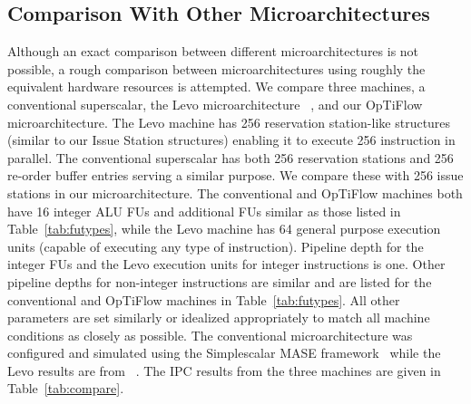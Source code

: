 \documentclass[10pt,dvips]{article}
\begin{document}
\subsection{Comparison With Other Microarchitectures}
%
Although an exact comparison between different microarchitectures
is not possible, a rough comparison between microarchitectures
using roughly the equivalent hardware resources is attempted.
We compare three machines, a conventional superscalar,
the Levo microarchitecture ~\cite{uht03levo}, and our OpTiFlow
microarchitecture.
The Levo machine has 256 reservation station-like structures
(similar to our Issue Station structures)
enabling it to execute 256 instruction in parallel.
The conventional superscalar has both 256 reservation stations
and 256 re-order buffer entries serving a similar purpose.
We compare these with 256 issue stations in our microarchitecture.
The conventional and OpTiFlow machines both have 16 integer
ALU FUs and additional FUs similar as those listed in Table~\ref{tab:futypes},
while the Levo machine has 64 general purpose execution units
(capable of executing any type of instruction).
Pipeline depth for the integer FUs and the Levo execution 
units for integer instructions is one.  Other pipeline depths
for non-integer instructions are similar and are listed
for the conventional and OpTiFlow machines in Table~\ref{tab:futypes}.
All other parameters are set similarly or idealized appropriately
to match all machine conditions as closely as possible.
The conventional microarchitecture was configured and simulated
using the Simplescalar MASE framework~\cite{Austin97}
while the Levo results are from ~\cite{uht03levo}.
The IPC results from the three machines are given in Table~\ref{tab:compare}.
%
\end{document}
